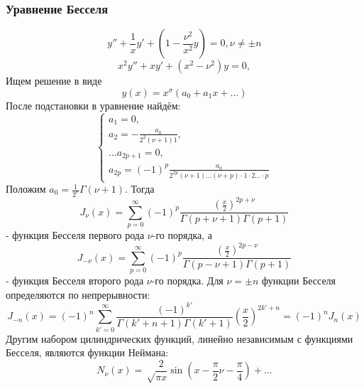 \documentclass[11pt]{article}
\begin{document}
\subsubsection{Уравнение Бесселя}
\label{sec:org421f5cb}
\begin{equation}
y'' + \frac1xy' + \left(1 - \frac{\nu^2}{x^2}y\right) = 0, \nu \neq \pm n
\end{equation}
\begin{equation}
x^2y'' + xy' + (x^2 - \nu^2)y = 0,
\end{equation}
Ищем решение в виде
\begin{equation}
y(x) = x^{\sigma}(a_0 + a_1x + \ldots)
\end{equation}
После подстановки в уравнение найдём:
\begin{equation}
\begin{cases}
a_1 = 0, \\
a_2 = -\frac{a_0}{2^2(\nu + 1)1}, \\
\ldots
a_{2p + 1} = 0, \\
a_{2p} = (-1)^p\frac{a_0}{2^{2p}(\nu + 1)\ldots(\nu + p)\cdot1\cdot2\ldots\cdot p}
\end{cases}
\end{equation}
Положим $a_0 = \frac1{2^{\nu}}\Gamma(\nu + 1)$. Тогда
\begin{equation}
J_{\nu}(x) = \sum_{p = 0}^{\infty}(-1)^p\frac{\left(\frac{x}2\right)^{2p + \nu}}{\Gamma(p + \nu + 1)\Gamma(p + 1)}
\end{equation}
- функция Бесселя первого рода $\nu$-го порядка, а
\begin{equation}
J_{-\nu}(x) = \sum_{p = 0}^{\infty}(-1)^p\frac{\left(\frac{x}2\right)^{2p-\nu}}{\Gamma(p - \nu + 1)\Gamma(p + 1)}
\end{equation}
- функция Бесселя второго рода $\nu$-го порядка. Для $\nu = \pm n$ функции Бесселя определяются по непрерывности:
\begin{equation}
J_{-n}(x) = (-1)^n\sum_{k' = 0}^{\infty}\frac{(-1)^{k'}}{\Gamma(k' + n + 1)\Gamma(k' + 1)}\left(\frac{x}2\right)^{2k' + n} = (-1)^nJ_n(x)
\end{equation}
Другим набором цилиндрических функций, линейно независимым с функциями Бесселя, являются функции Неймана:
\begin{equation}
N_{\nu}(x) = \sqrt\frac2{\pi x}\sin\left(x - \frac{\pi}2\nu - \frac{\pi}4\right) + \ldots
\end{equation}
\end{document}

